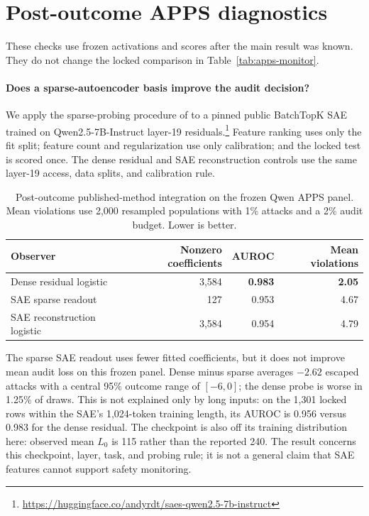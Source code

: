 \section{Post-outcome APPS diagnostics}
\label{app:apps-diagnostics}

These checks use frozen activations and scores after the main result was known.
They do not change the locked comparison in Table~\ref{tab:apps-monitor}.

\paragraph{Does a sparse-autoencoder basis improve the audit decision?}
We apply the sparse-probing procedure of \cite{kantamneni2025saeprobes} to a
pinned public BatchTopK SAE trained on Qwen2.5-7B-Instruct layer-19
residuals.\footnote{\url{https://huggingface.co/andyrdt/saes-qwen2.5-7b-instruct}}
Feature ranking uses only the fit split; feature count and regularization use
only calibration; and the locked test is scored once. The dense residual and
SAE reconstruction controls use the same layer-19 access, data splits, and
calibration rule.

\begin{table}[H]
\centering
\small
\caption{Post-outcome published-method integration on the frozen Qwen APPS
panel. Mean violations use 2,000 resampled populations with 1\% attacks and a
2\% audit budget. Lower is better.}
\label{tab:qwen-sae-probe-long}
\begin{tabular}{@{}lrrr@{}}
\toprule
Observer & Nonzero coefficients & AUROC & Mean violations \\
\midrule
Dense residual logistic & 3,584 & \textbf{0.983} & \textbf{2.05} \\
SAE sparse readout & 127 & 0.953 & 4.67 \\
SAE reconstruction logistic & 3,584 & 0.954 & 4.79 \\
\bottomrule
\end{tabular}
\end{table}

The sparse SAE readout uses fewer fitted coefficients, but it does not improve
mean audit loss on this frozen panel. Dense minus sparse averages $-2.62$
escaped attacks with a central 95\% outcome range of $[-6,0]$; the dense probe
is worse in 1.25\% of draws. This is not explained only by long inputs: on the
1,301 locked rows within the SAE's 1,024-token training length, its AUROC is
0.956 versus 0.983 for the dense residual. The checkpoint is also off its
training distribution here: observed mean $L_0$ is 115 rather than the reported
240. The result concerns this checkpoint, layer, task, and probing rule; it is
not a general claim that SAE features cannot support safety monitoring.

